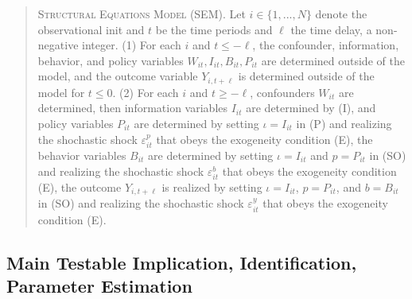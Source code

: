 \documentclass[11pt,reqno,letter]{amsart}
\theoremstyle{definition}
\begin{document}
\begin{quote}
\textsc{Structural Equations Model (SEM)}.  Let $i \in \{1,..., N\}$ denote the observational init and $t$ be the time periods and $\ell$ the time delay, a non-negative integer.  (1) For each $i$ and $t \leq -\ell$, the confounder, information, behavior, and policy variables $W_{it}, I_{it},  B_{it}, P_{it}$ are determined outside of the model, and the outcome variable $Y_{i, t+\ell}$ is determined outside of the model for $t \leq 0$.  (2) For each $i$ and $t \geq -\ell$, confounders $W_{it}$ are determined, then information variables $I_{it}$ are determined  by (I), and policy variables $P_{it}$ are determined by setting $\iota = I_{it}$  in (P) and realizing the shochastic shock $\varepsilon^p_{it}$ that obeys the exogeneity condition (E),  the behavior variables $B_{it}$ are determined by setting $\iota = I_{it}$ and $p= P_{it}$ in  (SO) and realizing  the shochastic shock $\varepsilon^b_{it}$ that obeys the exogeneity condition (E), the outcome $Y_{i, t + \ell}$ is realized by setting $\iota = I_{it}$, $p= P_{it}$, and $b = B_{it}$ in  (SO) and realizing the shochastic shock $\varepsilon^y_{it}$ that obeys the exogeneity condition (E). \end{quote}




\subsection{Main Testable Implication, Identification, Parameter Estimation}
\end{document}
